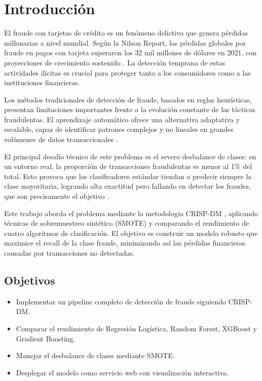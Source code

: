 \section{Introducción}

El fraude con tarjetas de crédito es un fenómeno delictivo que genera
pérdidas millonarias a nivel mundial. Según la Nilson Report, las pérdidas
globales por fraude en pagos con tarjeta superaron los 32 mil millones de
dólares en 2021, con proyecciones de crecimiento sostenido \cite{nilson2021}.
La detección temprana de estas actividades ilícitas es crucial para proteger
tanto a los consumidores como a las instituciones financieras.

Los métodos tradicionales de detección de fraude, basados en reglas
heurísticas, presentan limitaciones importantes frente a la evolución
constante de las tácticas fraudulentas. El aprendizaje automático ofrece
una alternativa adaptativa y escalable, capaz de identificar patrones
complejos y no lineales en grandes volúmenes de datos transaccionales
\cite{dal2015learned}.

El principal desafío técnico de este problema es el severo desbalance de
clases: en un entorno real, la proporción de transacciones fraudulentas
es menor al 1\% del total. Esto provoca que los clasificadores estándar
tiendan a predecir siempre la clase mayoritaria, logrando alta exactitud
pero fallando en detectar los fraudes, que son precisamente el objetivo
\cite{chawla2002smote}.

Este trabajo aborda el problema mediante la metodología CRISP-DM
\cite{wirth2000crisp}, aplicando técnicas de sobremuestreo sintético
(SMOTE) y comparando el rendimiento de cuatro algoritmos de clasificación.
El objetivo es construir un modelo robusto que maximice el recall de la
clase fraude, minimizando así las pérdidas financieras causadas por
transacciones no detectadas.

\subsection{Objetivos}
\begin{itemize}
  \item Implementar un pipeline completo de detección de fraude siguiendo CRISP-DM.
  \item Comparar el rendimiento de Regresión Logística, Random Forest,
        XGBoost y Gradient Boosting.
  \item Manejar el desbalance de clases mediante SMOTE.
  \item Desplegar el modelo como servicio web con visualización interactiva.
\end{itemize}
